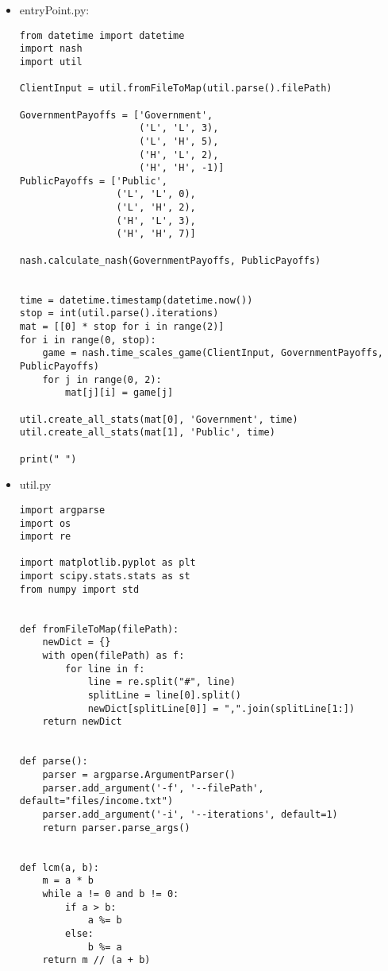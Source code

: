 
 \begin{itemize}
 \item entryPoint.py:
  \begin{lstlisting}[style=fsharpstyle]
 from datetime import datetime
import nash
import util

ClientInput = util.fromFileToMap(util.parse().filePath)

GovernmentPayoffs = ['Government',
                     ('L', 'L', 3),
                     ('L', 'H', 5),
                     ('H', 'L', 2),
                     ('H', 'H', -1)]
PublicPayoffs = ['Public',
                 ('L', 'L', 0),
                 ('L', 'H', 2),
                 ('H', 'L', 3),
                 ('H', 'H', 7)]

nash.calculate_nash(GovernmentPayoffs, PublicPayoffs)


time = datetime.timestamp(datetime.now())
stop = int(util.parse().iterations)
mat = [[0] * stop for i in range(2)]
for i in range(0, stop):
    game = nash.time_scales_game(ClientInput, GovernmentPayoffs, PublicPayoffs)
    for j in range(0, 2):
        mat[j][i] = game[j]

util.create_all_stats(mat[0], 'Government', time)
util.create_all_stats(mat[1], 'Public', time)

print(" ")

  \end{lstlisting}
 \item util.py
 \begin{lstlisting}[style=fsharpstyle]
import argparse
import os
import re

import matplotlib.pyplot as plt
import scipy.stats.stats as st
from numpy import std


def fromFileToMap(filePath):
    newDict = {}
    with open(filePath) as f:
        for line in f:
            line = re.split("#", line)
            splitLine = line[0].split()
            newDict[splitLine[0]] = ",".join(splitLine[1:])
    return newDict


def parse():
    parser = argparse.ArgumentParser()
    parser.add_argument('-f', '--filePath', default="files/income.txt")
    parser.add_argument('-i', '--iterations', default=1)
    return parser.parse_args()


def lcm(a, b):
    m = a * b
    while a != 0 and b != 0:
        if a > b:
            a %= b
        else:
            b %= a
    return m // (a + b)



\end{lstlisting}
\end{itemize}
